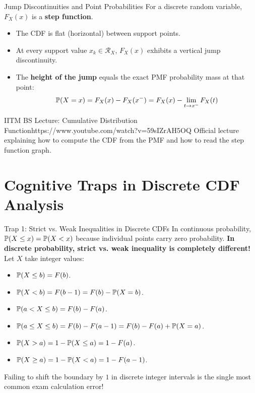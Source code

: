\begin{theorembox}{Jump Discontinuities and Point Probabilities}
For a discrete random variable, $F_X(x)$ is a \textbf{step function}.
\begin{itemize}
    \item The CDF is flat (horizontal) between support points.
    \item At every support value $x_k \in \mathcal{R}_X$, $F_X(x)$ exhibits a vertical jump discontinuity.
    \item The \textbf{height of the jump} equals the exact PMF probability mass at that point:
    $$\P(X = x) = F_X(x) - F_X(x^-) = F_X(x) - \lim_{t \to x^-} F_X(t)$$
\end{itemize}
\end{theorembox}

\begin{videocard}{IITM BS Lecture: Cumulative Distribution Function}{https://www.youtube.com/watch?v=59sIZrAH5OQ}
Official lecture explaining how to compute the CDF from the PMF and how to read the step function graph.
\end{videocard}

\section{Cognitive Traps in Discrete CDF Analysis}

\begin{trapbox}{Trap 1: Strict vs. Weak Inequalities in Discrete CDFs}
In continuous probability, $\P(X \le x) = \P(X < x)$ because individual points carry zero probability. \textbf{In discrete probability, strict vs. weak inequality is completely different!}
Let $X$ take integer values:
\begin{itemize}
    \item $\P(X \le b) = F(b)$.
    \item $\P(X < b) = F(b - 1) = F(b) - \P(X = b)$.
    \item $\P(a < X \le b) = F(b) - F(a)$.
    \item $\P(a \le X \le b) = F(b) - F(a - 1) = F(b) - F(a) + \P(X = a)$.
    \item $\P(X > a) = 1 - \P(X \le a) = 1 - F(a)$.
    \item $\P(X \ge a) = 1 - \P(X < a) = 1 - F(a - 1)$.
\end{itemize}
Failing to shift the boundary by $1$ in discrete integer intervals is the single most common exam calculation error!
\end{trapbox}

